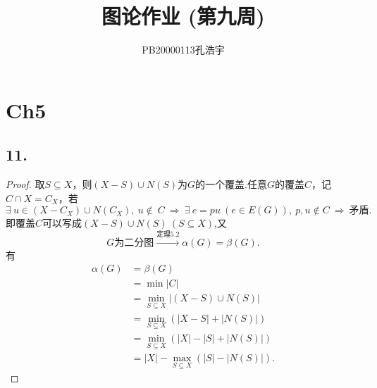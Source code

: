 \documentclass{article}
\title{图论作业 (第九周)}
\author{PB20000113孔浩宇}
\begin{document}
\maketitle
\section*{Ch5}
\subsection*{11.}
\begin{proof}
        取$S\subseteq X$，则$(X-S)\cup N(S)$为$G$的一个覆盖.任意$G$的覆盖$C$，记$C\cap X=C_X$，若
    \[
    \exists\ u\in (X-C_X) \cup N(C_X) ,\ u\notin\ C
    \ \Rightarrow\ 
    \exists\ e=pu\ (e\in E(G)),\ p,u\notin C
    \ \Rightarrow\ 
        \mbox{矛盾}.
    \]
    即覆盖$C$可以写成$(X-S)\cup N(S)\ (S\subseteq X)$,又
    \[
        G\mbox{为二分图}\xrightarrow{\mbox{定理5.2}}
        \alpha(G)=\beta(G).
    \]
    有
    \begin{align*}
        \alpha(G)&=\beta(G)\\
        &=\min |C|\\
        &=\min\limits_{S\subseteq X} | (X-S)\cup N(S) |\\
        &=\min\limits_{S\subseteq X} \left(|X-S|+|N(S)| \right)\\
        &=\min\limits_{S\subseteq X} \left(|X|-|S|+ |N(S) |\right)\\
        &=|X|-\max\limits_{S\subseteq X} \left(|S|-|N(S)|\right).
    \end{align*}
\end{proof}
\end{document}
